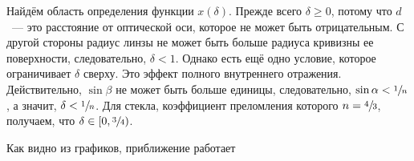 Найдём область определения функции $x(\delta)$. Прежде всего $\delta \geqslant 0$, потому что $d$~--- это расстояние от оптической оси, которое не может быть отрицательным. С другой стороны радиус линзы не может быть больше радиуса кривизны ее поверхности, следовательно, $\delta < 1$. Однако есть ещё одно условие, которое ограничивает $\delta$ сверху. Это эффект полного внутреннего отражения. Действительно, $\sin \beta$ не может быть больше единицы, следовательно, $\sin \alpha < \sfrac{1}{n}$, а значит, $\delta < \sfrac{1}{n}$. Для стекла, коэффициент преломления которого $n = \sfrac{4}{3}$, получаем, что $\delta \in [0, \sfrac{3}{4})$.

Как видно из графиков, приближение работает